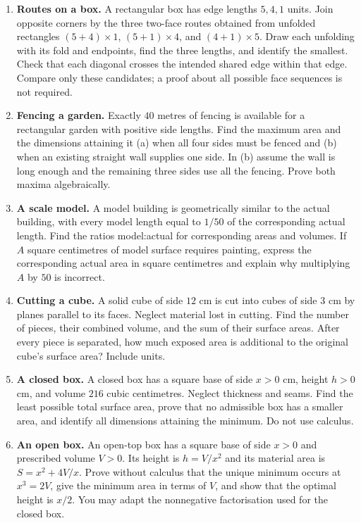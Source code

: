\begin{enumerate}
\item \textbf{Routes on a box.} A rectangular box has edge lengths
$5,4,1$ units. Join opposite corners by the three two-face routes obtained
from unfolded rectangles $(5+4)\times1$, $(5+1)\times4$, and
$(4+1)\times5$. Draw each unfolding with its fold and endpoints, find the
three lengths, and identify the smallest. Check that each diagonal crosses
the intended shared edge within that edge. Compare only these candidates;
a proof about all possible face sequences is not required.

\item \textbf{Fencing a garden.} Exactly $40$ metres of fencing is
available for a rectangular garden with positive side lengths. Find the
maximum area and the dimensions attaining it (a) when all four sides must
be fenced and (b) when an existing straight wall supplies one side. In (b)
assume the wall is long enough and the remaining three sides use all the
fencing. Prove both maxima algebraically.

\item \textbf{A scale model.} A model building is geometrically similar
to the actual building, with every model length equal to $1/50$ of the
corresponding actual length. Find the ratios model:actual for corresponding
areas and volumes. If $A$ square centimetres of model surface requires
painting, express the corresponding actual area in square centimetres and
explain why multiplying $A$ by $50$ is incorrect.

\item \textbf{Cutting a cube.} A solid cube of side $12$ cm is cut into
cubes of side $3$ cm by planes parallel to its faces. Neglect material lost
in cutting. Find the number of pieces, their combined volume, and the sum
of their surface areas. After every piece is separated, how much exposed
area is additional to the original cube's surface area? Include units.

\item \textbf{A closed box.} A closed box has a square base of side
$x>0$ cm, height $h>0$ cm, and volume $216$ cubic centimetres. Neglect
thickness and seams. Find the least possible total surface area, prove
that no admissible box has a smaller area, and identify all dimensions
attaining the minimum. Do not use calculus.

\item \textbf{An open box.} An open-top box has a square base of side
$x>0$ and prescribed volume $V>0$. Its height is $h=V/x^2$ and its
material area is $S=x^2+4V/x$. Prove without calculus that the unique
minimum occurs at $x^3=2V$, give the minimum area in terms of $V$, and
show that the optimal height is $x/2$. You may adapt the nonnegative
factorisation used for the closed box.


\end{enumerate}
